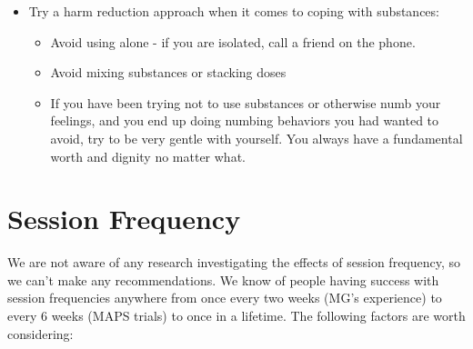 \documentclass[12pt,letterpaper]{book}
\begin{document}
\begin{itemize}
    \item Try a harm reduction approach when it comes to coping with substances:
    \begin{itemize}
        \item Avoid using alone - if you are isolated, call a friend on the phone.
        \item Avoid mixing substances or stacking doses
        \item If you have been trying not to use substances or otherwise numb your feelings, and you end up doing numbing behaviors you had wanted to avoid, try to be very gentle with yourself. You always have a fundamental worth and dignity no matter what.
    \end{itemize}
\end{itemize}
\section{Session Frequency}
We are not aware of any research investigating the effects of session frequency, so we can't make any recommendations. We know of people having success with session frequencies anywhere from once every two weeks (MG's experience) to every 6 weeks (MAPS trials) to once in a lifetime. The following factors are worth considering:
\end{document}
